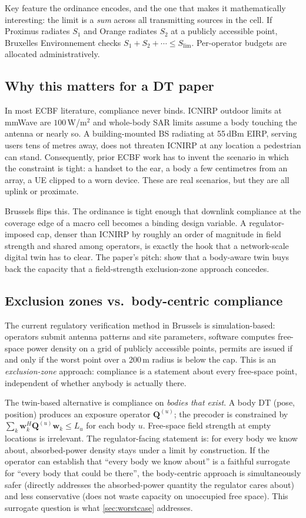 \documentclass[11pt,a4paper]{article}
\theoremstyle{definition}
\newcommand{\ww}{\mathbf{w}}
\newcommand{\Q}{\mathbf{Q}}
\begin{document}
Key feature the ordinance encodes, and the one that makes it
mathematically interesting: the limit is a \emph{sum} across all
transmitting sources in the cell. If Proximus radiates $S_1$ and
Orange radiates $S_2$ at a publicly accessible point, Bruxelles
Environnement checks $S_1+S_2+\cdots \le S_{\mathrm{lim}}$.
Per-operator budgets are allocated administratively.

\subsection{Why this matters for a DT paper}

In most ECBF literature, compliance never binds. ICNIRP outdoor limits
at mmWave are $100$\,W/m$^{2}$ and whole-body SAR limits assume a
body touching the antenna or nearly so. A building-mounted BS
radiating at 55\,dBm EIRP, serving users tens of metres away, does
not threaten ICNIRP at any location a pedestrian can stand.
Consequently, prior ECBF work has to invent the scenario in which the
constraint is tight: a handset to the ear, a body a few centimetres
from an array, a UE clipped to a worn device. These are real
scenarios, but they are all uplink or proximate.

Brussels flips this. The ordinance is tight enough that downlink
compliance at the coverage edge of a macro cell becomes a binding
design variable. A regulator-imposed cap, denser than ICNIRP by
roughly an order of magnitude in field strength and shared among
operators, is exactly the hook that a network-scale digital twin has
to clear. The paper's pitch: show that a body-aware twin buys back
the capacity that a field-strength exclusion-zone approach concedes.

\subsection{Exclusion zones vs.\ body-centric compliance}

The current regulatory verification method in Brussels is
simulation-based: operators submit antenna patterns and site
parameters, software computes free-space power density on a grid of
publicly accessible points, permits are issued if and only if the
worst point over a 200\,m radius is below the cap. This is an
\emph{exclusion-zone} approach: compliance is a statement about
every free-space point, independent of whether anybody is actually
there.

The twin-based alternative is compliance on \emph{bodies that exist}.
A body DT (pose, position) produces an exposure operator
$\Q^{(u)}$; the precoder is constrained by
$\sum_k\ww_k^H\Q^{(u)}\ww_k\le L_u$ for each body $u$. Free-space
field strength at empty locations is irrelevant. The regulator-facing
statement is: for every body we know about, absorbed-power density
stays under a limit by construction. If the operator can establish
that ``every body we know about'' is a faithful surrogate for
``every body that could be there'', the body-centric approach is
simultaneously safer (directly addresses the absorbed-power quantity
the regulator cares about) and less conservative (does not waste
capacity on unoccupied free space). This surrogate question is what
\cref{sec:worstcase} addresses.
\end{document}
